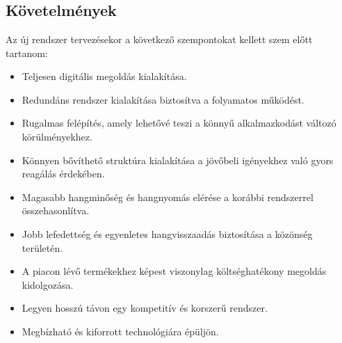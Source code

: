 \chapter{\SystemDesign}
\section{Követelmények}
Az új rendszer tervezésekor a következő szempontokat kellett szem előtt tartanom:
\begin{itemize}
	\item Teljesen digitális megoldás kialakítása.
	\item Redundáns rendszer kialakítása biztosítva a folyamatos működést.
	\item Rugalmas felépítés, amely lehetővé teszi a könnyű alkalmazkodást változó körülményekhez.
	\item Könnyen bővíthető struktúra kialakítása a jövőbeli igényekhez való gyors reagálás érdekében.
	\item Magasabb hangminőség és hangnyomás elérése a korábbi rendszerrel összehasonlítva.
	\item Jobb lefedettség és egyenletes hangvisszaadás biztosítása a közönség területén.
	\item A piacon lévő termékekhez képest viszonylag költséghatékony megoldás kidolgozása.
	\item Legyen hosszú távon egy kompetitív és korszerű rendszer.
	\item Megbízható és kiforrott technológiára épüljön.
\end{itemize}
